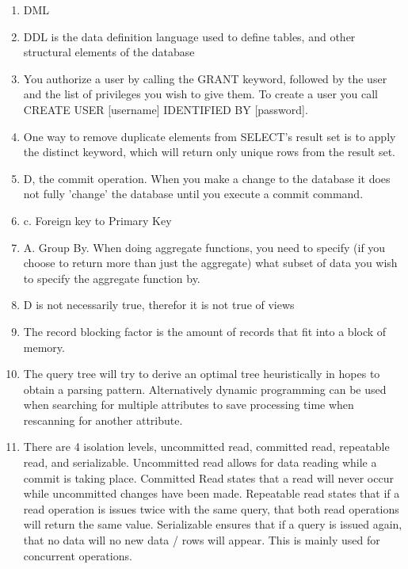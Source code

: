 \documentclass[12pt]{article}
\begin{document}
\begin{enumerate}
	\item DML
	
	\item DDL is the data definition language used to define tables, and other structural elements of the database
	
	\item You authorize a user by calling the GRANT keyword, followed by the user and the list of privileges you wish to give them. To create a user
you call CREATE USER [username] IDENTIFIED BY [password].

	\item One way to remove duplicate elements from SELECT's result set is to apply the distinct keyword, which will return only unique rows from the result set.

	\item D, the commit operation. When you make a change to the database it does not fully 'change' the database until you execute a commit command.

	\item c. Foreign key to Primary Key
	
	\item A. Group By. When doing aggregate functions, you need to specify (if you choose to return more than just the aggregate) what subset of data you wish to specify the aggregate function by.
	
	\item D is not necessarily true, therefor it is not true of views
	
	\item The record blocking factor is the amount of records that fit into a block of memory.
	
	\item The query tree will try to derive an optimal tree heuristically in hopes to obtain a parsing pattern. Alternatively dynamic programming can be used when searching for multiple attributes to save processing time when rescanning for another attribute.
	
	\item There are 4 isolation levels, uncommitted read, committed read, repeatable read, and serializable.
Uncommitted read allows for data reading while a commit is taking place. Committed Read states that
a read will never occur while uncommitted changes have been made. Repeatable read states that if a
read operation is issues twice with the same query, that both read operations will return the same value.
Serializable ensures that if a query is issued again, that no data will no new data / rows will appear.
This is mainly used for concurrent operations.


\end{enumerate}
\end{document}
